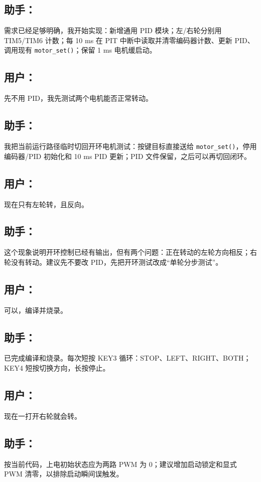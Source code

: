 \documentclass[11pt,a4paper,fontset=fandol]{ctexart}
\begin{document}
\subsection*{助手：}
需求已经足够明确，我开始实现：新增通用 PID 模块；左/右轮分别用 TIM5/TIM6 计数；每 10 ms 在 PIT 中断中读取并清零编码器计数、更新 PID、调用现有 \texttt{motor\_set()}；保留 1 ms 电机缓启动。

\subsection*{用户：}
先不用 PID，我先测试两个电机能否正常转动。

\subsection*{助手：}
我把当前运行路径临时切回开环电机测试：按键目标直接送给 \texttt{motor\_set()}，停用编码器/PID 初始化和 10 ms PID 更新；PID 文件保留，之后可以再切回闭环。

\subsection*{用户：}
现在只有左轮转，且反向。

\subsection*{助手：}
这个现象说明开环控制已经有输出，但有两个问题：正在转动的左轮方向相反；右轮没有转动。建议先不要改 PID，先把开环测试改成“单轮分步测试”。

\subsection*{用户：}
可以，编译并烧录。

\subsection*{助手：}
已完成编译和烧录。每次短按 KEY3 循环：STOP、LEFT、RIGHT、BOTH；KEY4 短按切换方向，长按停止。

\subsection*{用户：}
现在一打开右轮就会转。

\subsection*{助手：}
按当前代码，上电初始状态应为两路 PWM 为 0；建议增加启动锁定和显式 PWM 清零，以排除启动瞬间误触发。
\end{document}
